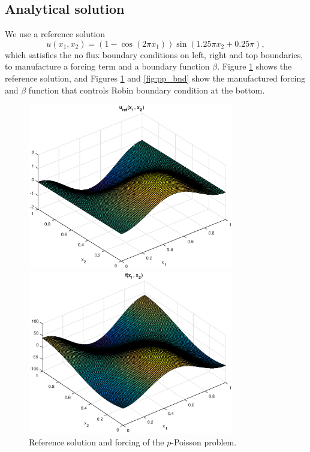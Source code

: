 \documentclass[a4paper,11pt]{scrartcl}
\newcommand{\eq}[1]{\begin{equation} #1 \end{equation}}
\begin{document}
\subsection{Analytical solution}

We use a reference solution
\eq{u(x_1, x_2) = ( 1 - \cos(2 \pi x_1) ) \sin(1.25 \pi x_2 + 0.25 \pi ),}
which satisfies the no flux boundary conditions on left, right and top boundaries, to manufacture a forcing term and a boundary function $\beta$.
%
Figure \ref{fig:pp_ref} shows the reference solution, and Figures \ref{fig:pp_ref} and \ref{fig:pp_bnd} show the manufactured forcing and $\beta$ function that controls Robin boundary condition at the bottom.


\begin{figure}
\centerline{\includegraphics[width=0.8\textwidth]{ref_state.eps}}
\centerline{\includegraphics[width=0.8\textwidth]{ref_forcing.eps}}
\caption{Reference solution and forcing of the $p$-Poisson problem. }
\label{fig:pp_ref}
\end{figure}
\end{document}

